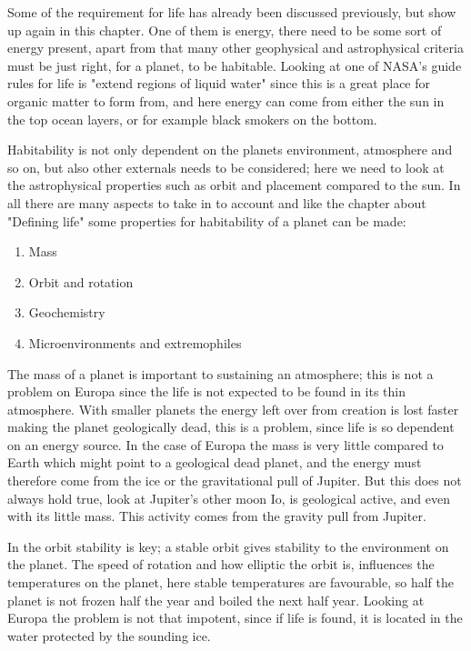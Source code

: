 Some of the requirement for life has already been discussed previously, but show up again in this chapter. One of them is energy, there need to be some sort of energy present, apart from that many other geophysical and astrophysical criteria must be just right, for a planet, to be habitable. Looking at one of NASA's guide rules for life is "extend regions of liquid water\cite{NasaWater}"  since this is a great place for organic matter to form from, and here energy can come from either the sun in the top ocean layers, or for example black smokers on the bottom.

Habitability is not only dependent on the planets environment, atmosphere and so on, but also other externals needs to be considered; here we need to look at the astrophysical properties such as orbit and placement compared to the sun. In all there are many aspects to take in to account and like the chapter about "Defining life" some properties for habitability of a planet can be made:
\begin{enumerate}
  \item Mass
  \item Orbit and rotation
  \item Geochemistry
  \item Microenvironments and extremophiles
\end{enumerate}
The mass of a planet is important to sustaining an atmosphere; this is not a problem on Europa since the life is not expected to be found in its thin atmosphere. With smaller planets the energy left over from creation is lost faster making the planet geologically dead, this is a problem, since life is so dependent on an energy source. In the case of Europa the mass is very little compared to Earth which might point to a geological dead planet, and the energy must therefore come from the ice or the gravitational pull of Jupiter. But this does not always hold true, look at Jupiter's other moon Io, is geological active, and even with its little mass. This activity comes from the gravity pull from Jupiter.

In the orbit stability is key; a stable orbit gives stability to the environment on the planet. The speed of rotation and how elliptic the orbit is, influences the temperatures on the planet, here stable temperatures are favourable, so half the planet is not frozen half the year and boiled the next half year. Looking at Europa the problem is not that impotent, since if life is found, it is located in the water protected by the sounding ice.

